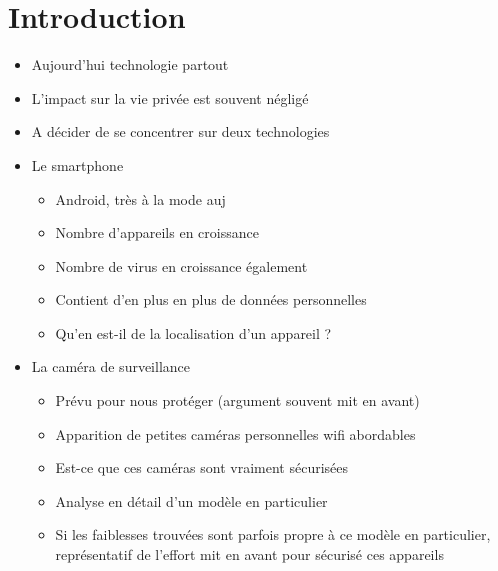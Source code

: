 \chapter*{Introduction}

\begin{itemize}
\item Aujourd'hui technologie partout
\item L'impact sur la vie privée est souvent négligé
\item A décider de se concentrer sur deux technologies
\item Le smartphone
  \begin{itemize}
  \item Android, très à la mode auj
  \item Nombre d'appareils en croissance
  \item Nombre de virus en croissance également
  \item Contient d'en plus en plus de données personnelles
  \item Qu'en est-il de la localisation d'un appareil ?
  \end{itemize}
\item La caméra de surveillance
  \begin{itemize}
  \item Prévu pour nous protéger (argument souvent mit en avant)
  \item Apparition de petites caméras personnelles wifi abordables
  \item Est-ce que ces caméras sont vraiment sécurisées
  \item Analyse en détail d'un modèle en particulier
  \item Si les faiblesses trouvées sont parfois propre à ce modèle en particulier, représentatif de l'effort mit en avant pour sécurisé ces appareils
  \end{itemize}
\end{itemize}